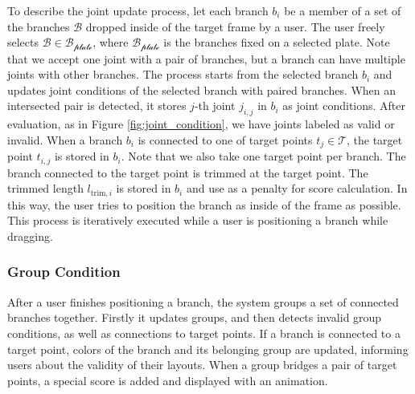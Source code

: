 To describe the joint update process, let each branch $b_i$ be a member of a set of the branches $\mathcal{B}$ dropped inside of the target frame by a user.
The user freely selects $\mathcal{B} \in \mathcal{B_\text{plate}}$, where $\mathcal{B_\text{plate}}$ is the branches fixed on a selected plate.
Note that we accept one joint with a pair of branches, but a branch can have multiple joints with other branches.
The process starts from the selected branch $b_i$ and updates joint conditions of the selected branch with paired branches.
When an intersected pair is detected, it stores $j$-th joint $j_{i, j}$ in $b_i$ as joint conditions.
After evaluation, as in Figure \ref{fig:joint_condition},  we have joints labeled as valid or invalid.
When a branch $b_i$ is connected to one of target points $t_j \in \mathcal{T}$, the target point $t_{i, j}$ is stored in $b_i$.
Note that we also take one target point per branch.
The branch connected to the target point is trimmed at the target point.
The trimmed length $l_{\text{trim}, i}$ is stored in $b_i$ and use as a penalty for score calculation.
In this way, the user tries to position the branch as inside of the frame as possible.
This process is iteratively executed while a user is positioning a branch while dragging.






\subsubsection{Group Condition}

After a user finishes positioning a branch, the system groups a set of connected branches together.
Firstly it updates groups, and then detects invalid group conditions, as well as connections to target points.
If a branch is connected to a target point, colors of the branch and its belonging group are updated, informing users about the validity of their layouts.
When a group bridges a pair of target points, a special score is added and displayed with an animation.

